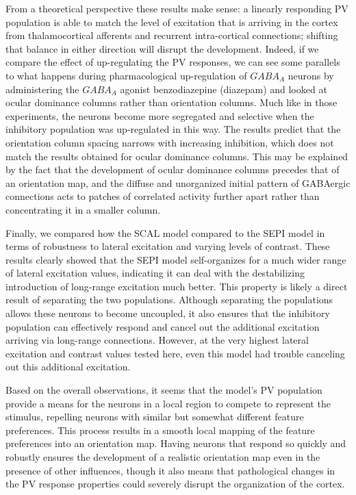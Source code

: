 From a theoretical perspective these results make sense: a linearly
responding PV population is able to match the level of excitation that
is arriving in the cortex from thalamocortical afferents and recurrent
intra-cortical connections; shifting that balance in either direction
will disrupt the development. Indeed, if we compare the effect of
up-regulating the PV responses, we can see some parallels to what
happens during pharmacological up-regulation of $GABA_A$ neurons by
administering the $GABA_A$ agonist benzodiazepine (diazepam)
\citep{Fagiolini2004,Hensch2004} and looked at ocular dominance
columns rather than orientation columns. Much like in those
experiments, the neurons become more segregated and selective when the
inhibitory population was up-regulated in this way. The results
predict that the orientation column spacing narrows with increasing
inhibition, which does not match the results obtained for ocular
dominance columns. This may be explained by the fact that the
development of ocular dominance columns precedes that of an
orientation map, and the diffuse and unorganized initial pattern of
GABAergic connections acts to patches of correlated activity further
apart rather than concentrating it in a smaller column.

Finally, we compared how the SCAL model compared to the SEPI model in
terms of robustness to lateral excitation and varying levels of
contrast. These results clearly showed that the SEPI model
self-organizes for a much wider range of lateral excitation values,
indicating it can deal with the destabilizing introduction of
long-range excitation much better. This property is likely a direct
result of separating the two populations. Although separating the
populations allows these neurons to become uncoupled, it also ensures
that the inhibitory population can effectively respond and cancel out
the additional excitation arriving via long-range
connections. However, at the very highest lateral excitation and
contrast values tested here, even this model had trouble canceling out
this additional excitation.

Based on the overall observations, it seems that the model's PV
population provide a means for the neurons in a local region to
compete to represent the stimulus, repelling neurons with similar but
somewhat different feature preferences.  This process results in a
smooth local mapping of the feature preferences into an orientation
map. Having neurons that respond so quickly and robustly ensures the
development of a realistic orientation map even in the presence of
other influences, though it also means that pathological changes in
the PV response properties could severely disrupt the organization of
the cortex.

